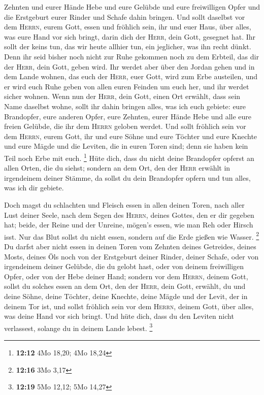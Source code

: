 Zehnten und eurer Hände Hebe und eure Gelübde und eure freiwilligen
Opfer und die Erstgeburt eurer Rinder und Schafe dahin bringen.
 Und sollt daselbst vor dem \textsc{Herrn}, eurem Gott,
essen und fröhlich sein, ihr und euer Haus, über alles, was eure Hand
vor sich bringt, darin dich der \textsc{Herr}, dein Gott, gesegnet hat.
 Ihr sollt der keins tun, das wir heute allhier tun, ein
jeglicher, was ihn recht dünkt.  Denn ihr seid bisher noch
nicht zur Ruhe gekommen noch zu dem Erbteil, das dir der \textsc{Herr},
dein Gott, geben wird.  Ihr werdet aber über den Jordan
gehen und in dem Lande wohnen, das euch der \textsc{Herr}, euer Gott,
wird zum Erbe austeilen, und er wird euch Ruhe geben von allen euren
Feinden um euch her, und ihr werdet sicher wohnen.  Wenn
nun der \textsc{Herr}, dein Gott, einen Ort erwählt, dass sein Name
daselbst wohne, sollt ihr dahin bringen alles, was ich euch gebiete:
eure Brandopfer, eure anderen Opfer, eure Zehnten, eurer Hände Hebe und
alle eure freien Gelübde, die ihr dem \textsc{Herrn} geloben werdet.
 Und sollt fröhlich sein vor dem \textsc{Herrn}, eurem
Gott, ihr und eure Söhne und eure Töchter und eure Knechte und eure
Mägde und die Leviten, die in euren Toren sind; denn sie haben kein Teil
noch Erbe mit euch. \footnote{\textbf{12:12} 4Mo 18,20; 4Mo 18,24}
 Hüte dich, dass du nicht deine Brandopfer opferst an
allen Orten, die du siehst;  sondern an dem Ort, den der
\textsc{Herr} erwählt in irgendeinem deiner Stämme, da sollst du dein
Brandopfer opfern und tun alles, was ich dir gebiete.

 Doch magst du schlachten und Fleisch essen in allen
deinen Toren, nach aller Lust deiner Seele, nach dem Segen des
\textsc{Herrn}, deines Gottes, den er dir gegeben hat; beide, der Reine
und der Unreine, mögen's essen, wie man Reh oder Hirsch isst.
 Nur das Blut sollst du nicht essen, sondern auf die Erde
gießen wie Wasser. \footnote{\textbf{12:16} 3Mo 3,17}  Du
darfst aber nicht essen in deinen Toren vom Zehnten deines Getreides,
deines Mosts, deines Öls noch von der Erstgeburt deiner Rinder, deiner
Schafe, oder von irgendeinem deiner Gelübde, die du gelobt hast, oder
von deinem freiwilligen Opfer, oder von der Hebe deiner Hand;
 sondern vor dem \textsc{Herrn}, deinem Gott, sollst du
solches essen an dem Ort, den der \textsc{Herr}, dein Gott, erwählt, du
und deine Söhne, deine Töchter, deine Knechte, deine Mägde und der
Levit, der in deinem Tor ist, und sollst fröhlich sein vor dem
\textsc{Herrn}, deinem Gott, über alles, was deine Hand vor sich bringt.
 Und hüte dich, dass du den Leviten nicht verlassest,
solange du in deinem Lande lebest. \footnote{\textbf{12:19} 5Mo 12,12;
  5Mo 14,27}

